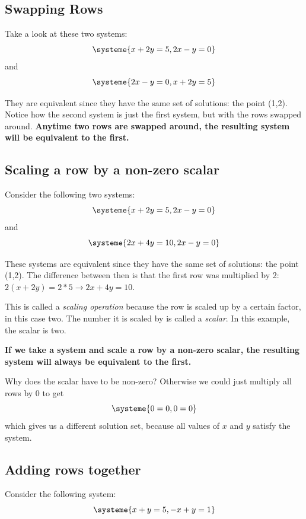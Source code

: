 \documentclass[a4paper,twoside,12pt]{memoir}  %
\begin{document}
\subsection{Swapping Rows}
Take a look at these two systems:
\begin{equation*}
  \systeme{
    x + 2y = 5,
    2x - y = 0
  }
\end{equation*}
and
\begin{equation*}
  \systeme{
    2x - y = 0,
    x + 2y = 5
  }
\end{equation*}

They are equivalent since they have the same set of solutions: the point (1,2).
Notice how the second system is just the first system, but with the rows swapped around.
\textbf{Anytime two rows are swapped around, the resulting system will be equivalent to the first.}

\subsection{Scaling a row by a non-zero scalar}
Consider the following two systems:
\begin{equation*}
  \systeme{
    x + 2y = 5,
    2x - y = 0
  }
\end{equation*}
and
\begin{equation*}
  \systeme{
    2x + 4y = 10,
    2x - y = 0
  }
\end{equation*}

These systems are equivalent since they have the same set of solutions: the point (1,2).
The difference between then is that the first row was multiplied by 2: $2(x+2y)=2*5 \rightarrow 2x + 4y = 10$.

This is called a \textit{scaling operation} because the row is scaled up by a certain factor, in this case two.
The number it is scaled by is called a \textit{scalar}. In this example, the scalar is two.

\textbf{If we take a system and scale a row by a \textbf{non-zero} scalar, the resulting system will always be equivalent to the first.}

Why does the scalar have to be non-zero? Otherwise we could just multiply all rows by 0 to get
\begin{equation*}
  \systeme{
    0 = 0,
    0 = 0
  }
\end{equation*}
which gives us a different solution set, because all values of $x$ and $y$ satisfy the system.

\subsection{Adding rows together}
Consider the following system:
\begin{equation*}
  \systeme{
     x + y = 5,
    -x + y = 1
  }
\end{equation*}
\end{document}
